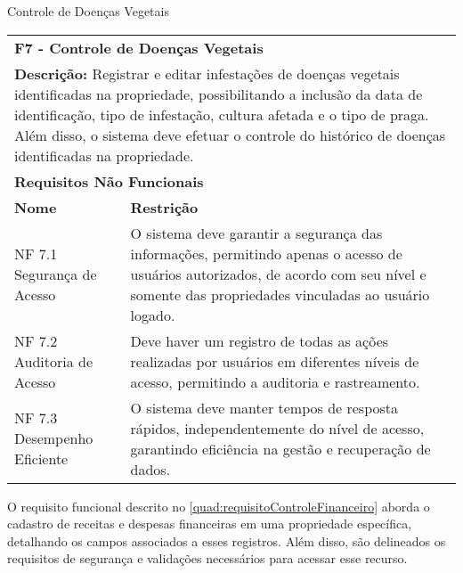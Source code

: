 \begin{tabframed}[htb]
  \caption{Controle de Doenças Vegetais}
  \label{quad:requisitoControleDoençasVegetais}
  \renewcommand{\arraystretch}{1.5}
  \begin{tabular}{|l|l|}
    \cline{1-2}
    \multicolumn{2}{|l|}{\textbf{F7 - Controle de Doenças Vegetais}}
    \\ \cline{1-2}

    \multicolumn{2}{|p{15cm}|}{
    \raggedright \textbf{Descrição:} Registrar e editar infestações de doenças vegetais identificadas na propriedade, possibilitando a inclusão da data de identificação, tipo de infestação, cultura afetada e o tipo de praga. Além disso, o sistema deve efetuar o controle do histórico de doenças identificadas na propriedade.
    }
    \\ \cline{1-2}

    \multicolumn{2}{|l|}{\textbf{Requisitos Não Funcionais}}
    \\ \cline{1-2}

    \textbf{Nome}               &
    \textbf{Restrição}
    \\ \cline{1-2}

    NF 7.1 Segurança de Acesso  &
    \multicolumn{1}{|p{8cm}|}{\raggedright O sistema deve garantir a segurança das informações, permitindo apenas o acesso de usuários autorizados, de acordo com seu nível e somente das propriedades vinculadas ao usuário logado.}
    \\ \cline{1-2}

    NF 7.2 Auditoria de Acesso  &
    \multicolumn{1}{|p{8cm}|}{\raggedright Deve haver um registro de todas as ações realizadas por usuários em diferentes níveis de acesso, permitindo a auditoria e rastreamento.}
    \\ \cline{1-2}

    NF 7.3 Desempenho Eficiente &
    \multicolumn{1}{|p{8cm}|}{\raggedright O sistema deve manter tempos de resposta rápidos, independentemente do nível de acesso, garantindo eficiência na gestão e recuperação de dados.}
    \\ \cline{1-2}
  \end{tabular}
  \fonte{} %
\end{tabframed}

\clearpage

O requisito funcional descrito no \autoref{quad:requisitoControleFinanceiro}  aborda o cadastro de receitas e despesas financeiras em uma propriedade específica, detalhando os campos associados a esses registros. Além disso, são delineados os requisitos de segurança e validações necessários para acessar esse recurso.

